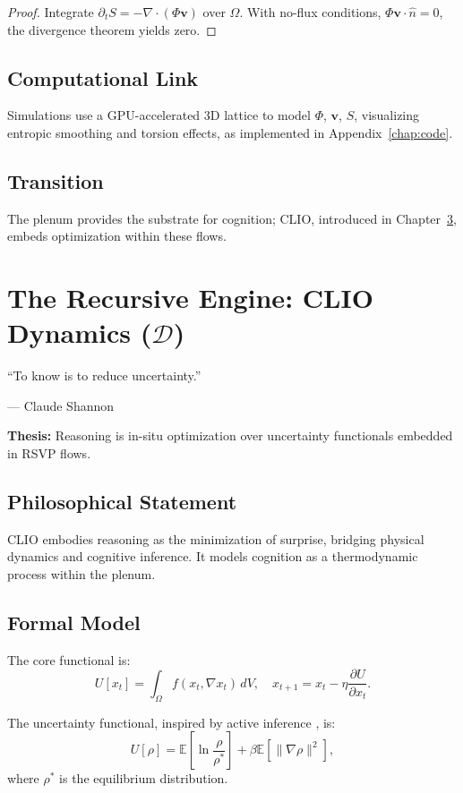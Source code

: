 \documentclass[12pt]{book}
\theoremstyle{definition}
\begin{document}
\begin{proof}
Integrate $\partial_t S = -\nabla \cdot (\Phi \mathbf{v})$ over $\Omega$. With no-flux conditions, $\Phi \mathbf{v} \cdot \hat{n} = 0$, the divergence theorem yields zero.
\end{proof}

\section{Computational Link}
Simulations use a GPU-accelerated 3D lattice to model $\Phi$, $\mathbf{v}$, $S$, visualizing entropic smoothing and torsion effects, as implemented in Appendix~\ref{chap:code}.

\section{Transition}
The plenum provides the substrate for cognition; CLIO, introduced in Chapter~\ref{chap:clio}, embeds optimization within these flows.

\chapter{The Recursive Engine: CLIO Dynamics ($\mathcal{D}$)}
\label{chap:clio}
\epigraph{``To know is to reduce uncertainty.''}{--- Claude Shannon}

\textbf{Thesis:} Reasoning is in-situ optimization over uncertainty functionals embedded in RSVP flows.

\section{Philosophical Statement}
CLIO embodies reasoning as the minimization of surprise, bridging physical dynamics and cognitive inference. It models cognition as a thermodynamic process within the plenum.

\section{Formal Model}
The core functional is:
\begin{equation}
U[x_t] = \int_\Omega f(x_t, \nabla x_t) \, dV, \quad x_{t+1} = x_t - \eta \frac{\partial U}{\partial x_t}.
\end{equation}

The uncertainty functional, inspired by active inference \cite{friston2023active}, is:
\begin{equation}
U[\rho] = \mathbb{E}\left[ \ln \frac{\rho}{\rho^*} \right] + \beta \mathbb{E}\left[ \|\nabla \rho\|^2 \right],
\end{equation}
where $\rho^*$ is the equilibrium distribution.
\end{document}
